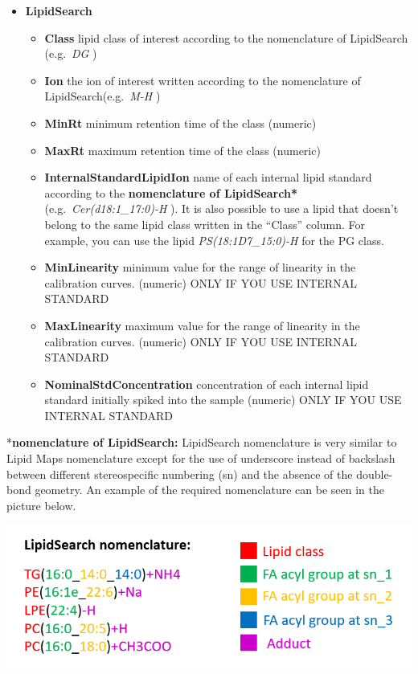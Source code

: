 \documentclass[
]{book}
\providecommand{\tightlist}{%
  \setlength{\itemsep}{0pt}\setlength{\parskip}{0pt}}
\begin{document}
\begin{itemize}
\tightlist
\item
  \textbf{LipidSearch}

  \begin{itemize}
  \tightlist
  \item
    \textbf{Class} lipid class of interest according to the nomenclature of LipidSearch (e.g.~\emph{DG} )
  \item
    \textbf{Ion} the ion of interest written according to the nomenclature of LipidSearch(e.g.~\emph{M-H} )
  \item
    \textbf{MinRt} minimum retention time of the class (numeric)
  \item
    \textbf{MaxRt} maximum retention time of the class (numeric)
  \item
    \textbf{InternalStandardLipidIon} name of each internal lipid standard according to the \textbf{nomenclature of LipidSearch*} (e.g.~\emph{Cer(d18:1\_17:0)-H} ). It is also possible to use a lipid that doesn't belong to the same lipid class written in the ``Class'' column. For example, you can use the lipid \emph{PS(18:1D7\_15:0)-H} for the PG class.
  \item
    \textbf{MinLinearity} minimum value for the range of linearity in the calibration curves. (numeric) ONLY IF YOU USE INTERNAL STANDARD
  \item
    \textbf{MaxLinearity} maximum value for the range of linearity in the calibration curves. (numeric) ONLY IF YOU USE INTERNAL STANDARD
  \item
    \textbf{NominalStdConcentration} concentration of each internal lipid standard initially spiked into the sample (numeric) ONLY IF YOU USE INTERNAL STANDARD
  \end{itemize}
\end{itemize}

*\textbf{nomenclature of LipidSearch:} LipidSearch nomenclature is very similar to Lipid Maps nomenclature except for the use of underscore instead of backslash between different stereospecific numbering (sn) and the absence of the double-bond geometry. An example of the required nomenclature can be seen in the picture below.

\includegraphics[width=1\linewidth]{images/nomenclature}
\end{document}
